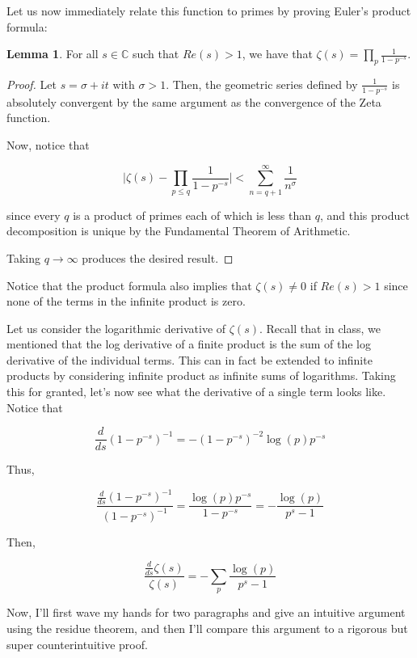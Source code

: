 \documentclass{article}
\theoremstyle{definition}
\newtheorem{lemma}[theorem]{Lemma}
\newcommand{\C}{\mathbb{C}}
\begin{document}
Let us now immediately relate this function to primes by proving Euler's product formula:

\begin{lemma}
    For all $ s \in \C $ such that $ Re(s) > 1 $, we have that $ \zeta(s) = \prod_{p} \frac{1}{1 - p^{-s}} $.
\end{lemma}

\begin{proof}
    Let $ s = \sigma + it $ with $ \sigma > 1 $.
    Then, the geometric series defined by $ \frac{1}{1 - p^{-s}} $ is absolutely convergent by the
    same argument as the convergence of the Zeta function.

    Now, notice that

    \[ \lvert \zeta(s) - \prod_{p \leq q} \frac{1}{1 - p^{-s}} \rvert < \sum_{n = q + 1}^{\infty} \frac{1}{n^{\sigma}} \]

    since every $ q $ is a product of primes each of which is less than $ q $, and this product decomposition
    is unique by the Fundamental Theorem of Arithmetic.

    Taking $ q \to \infty $ produces the desired result.
\end{proof}

Notice that the product formula also implies that $ \zeta(s) \neq 0 $ if $ Re(s) > 1 $ since
none of the terms in the infinite product is zero.

Let us consider the logarithmic derivative of $ \zeta(s) $.
Recall that in class, we mentioned that the log derivative of a finite product is the sum of the
log derivative of the individual terms. This can in fact be extended to infinite products
by considering infinite product as infinite sums of logarithms. Taking this for granted,
let's now see what the derivative of a single term looks like. Notice that


\[ \frac{d}{ds} (1 - p^{-s})^{-1} = - (1 - p^{-s})^{-2} \log(p) p^{-s}\]

Thus, 

\[ \frac{\frac{d}{ds} (1 - p^{-s})^{-1}}{(1 - p^{-s})^{-1}} = \frac{\log(p) p^{-s}}{1 - p^{-s}} = - \frac{\log (p)}{p^{s} - 1} \]

Then, 

\[ \frac{\frac{d}{ds} \zeta(s)}{\zeta(s)} = - \sum_{p} \frac{\log (p)}{p^{s} - 1} \]


Now, I'll first wave my hands for two paragraphs and give an intuitive argument
using the residue theorem, and then I'll compare this argument to a rigorous
but super counterintuitive proof.
\end{document}
